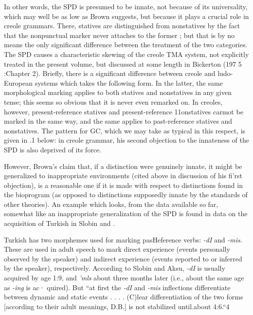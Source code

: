 In other words, the SPD is presumed to be innate, not because of its universality, which may well be as low as Brown suggests, but because it plays a crucial role in creole grammars. There, statives are distinguished from nonstatives by the fact that the nonpunctual marker never attaches to the former ; but that is by no means the only signifi\-cant difference between the treatment of the two categories. The SPD causes a characteristic skewing of the creole TMA system, not explicitly treated in the present volume, but discussed at some length in Bicker\-ton (197 5 :Chapter 2). Briefly, there is a significant difference between creole and ludo-European systems which takes the following form. In the latter, the same morphological marking applies to both statives and nonstatives in any given tense; this seems so obvious that it is never even remarked on. In creoles, however, present-reference statives and present-reference 11onstatives carmot be marked in the same way, and the same applies to past-reference statives and nonstatives. The pattern for GC, which we may take as typical in this respect, is given in .1 below:
in creole grammar, his second objection to the innateness of the SPD is also deprived of its force.

However, Brown's claim that, if a distinction were genuinely
innate, it might be generalized to inappropriate environments (cited above in discussion of his fi'rst objection), is a reasonable one if it is made with respect to distinctions found in the bioprogram (as opposed to distinctions supposedly innate by the standards of other theories). An example which looks, from the data available so far, somewhat like
an inappropriate generalization of the SPD is found in data on the
acquisition of Turkish in Slobin and \citet{Aksu1980}.

Turkish has two morphemes used for marking pasHeference verbs: \textit{-dI} and \textit{-}\textit{m}\textit{i}\textit{s.} These are used in adult speech to mark direct experience (events personally observed by the speaker) and indirect experience (events reported to or inferred by the speaker), respectively. According to Slobin and Aksu, \textit{-dI} is usually acquired by age 1:9, and \textit{'mls} about three months later (i.e., about the same age as \textit{-i}\textit{n}\textit{g} is ac· quired). But ``at first the \textit{-dI} and \textit{-}\textit{m}\textit{i}\textit{s} inflections differentiate between dynamic and static events . . . . (C)lear differentiation of the two
forms [according to their adult meanings, D.B.] is not stabilized until.about 4:6.``4

